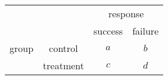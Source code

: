 
\begin{center}
\begin{longtable}{cccc}
 & & \multicolumn{2}{c}{response} \\
 & & success & failure \\
group & control & $a$ & $b$ \\   
      & treatment  & $c$ & $d$ \\
\end{longtable}
\end{center}
